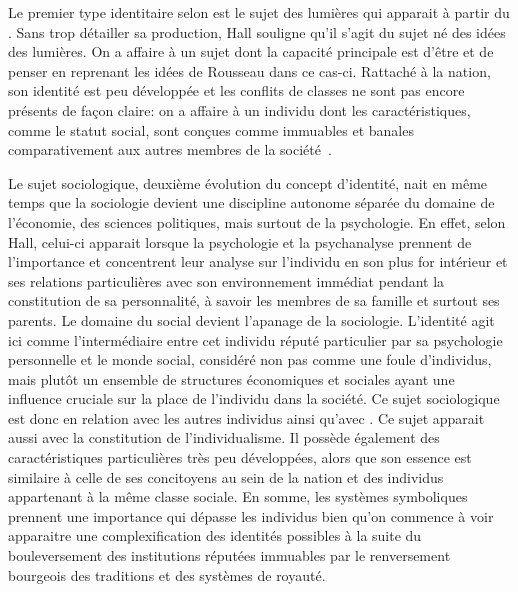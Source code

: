 Le premier type identitaire selon \citeauthor{Hall1996a} est le sujet des lumières qui apparait à partir du . 
Sans trop détailler sa production, Hall souligne qu'il s'agit du sujet né des idées des lumières. 
On a affaire à un sujet dont la capacité principale est d'être et de penser en reprenant les idées de Rousseau dans ce cas-ci. 
Rattaché à la nation, son identité est peu développée et les conflits de classes ne sont pas encore présents de façon claire: on a affaire à un individu dont les caractéristiques, comme le statut social, sont conçues comme immuables et banales comparativement aux autres membres de la société~\citeyearpar[596]{Hall1996a}.

Le sujet sociologique, deuxième évolution du concept d'identité, nait en même temps que la sociologie devient une discipline autonome séparée du domaine de l'économie, des sciences politiques, mais surtout de la psychologie. 
En effet, selon Hall, celui-ci apparait lorsque la psychologie et la psychanalyse prennent de l'importance et concentrent leur analyse sur l'individu en son plus for intérieur et ses relations particulières avec son environnement immédiat pendant la constitution de sa personnalité, à savoir les membres de sa famille et surtout ses parents. 
Le domaine du social devient l'apanage de la sociologie. 
L'identité agit ici comme l'intermédiaire entre cet individu réputé particulier par sa psychologie personnelle et le monde social, considéré non pas comme une foule d'individus, mais plutôt un ensemble de structures économiques et sociales ayant une influence cruciale sur la place de l'individu dans la société. 
Ce sujet sociologique est donc en relation avec les autres individus ainsi qu'avec . 
Ce sujet apparait aussi avec la constitution de l'individualisme. 
Il possède également des caractéristiques particulières très peu développées, alors que son essence est similaire à celle de ses concitoyens au sein de la nation et des individus appartenant à la même classe sociale. 
En somme, les systèmes symboliques prennent une importance qui dépasse les individus bien qu'on commence à voir apparaitre une complexification des identités possibles à la suite du bouleversement des institutions réputées immuables par le renversement bourgeois des traditions et des systèmes de royauté. 

